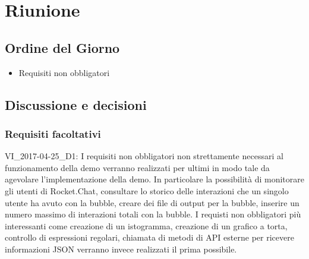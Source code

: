\section{Riunione}
\subsection{Ordine del Giorno}
\begin{itemize}
	\item Requisiti non obbligatori
\end{itemize}

\subsection{Discussione e decisioni}

\subsubsection{Requisiti facoltativi}
VI\_2017-04-25\_D1: I requisiti non obbligatori non strettamente necessari al funzionamento della demo verranno realizzati per ultimi in modo tale da agevolare l'implementazione della demo. In particolare la possibilità di monitorare gli utenti di Rocket.Chat, consultare lo storico delle interazioni che un singolo utente ha avuto con la bubble, creare dei file di output per la bubble, inserire un numero massimo di interazioni totali con la bubble. I requisti non obbligatori più interessanti come creazione di un istogramma, creazione di un grafico a torta, controllo di espressioni regolari, chiamata di metodi di API esterne per ricevere informazioni JSON verranno invece realizzati il prima possibile.

\clearpage
